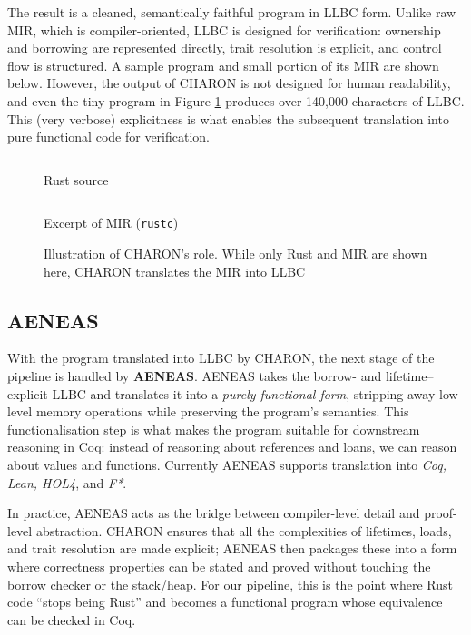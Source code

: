 The result is a cleaned, semantically faithful program in LLBC form. Unlike raw
MIR, which is compiler-oriented, LLBC is designed for verification: ownership
and borrowing are represented directly, trait resolution is explicit, and
control flow is structured. A sample program and small portion of its MIR are
shown below. However, the output of CHARON is not designed for human
readability, and even the tiny program in Figure \ref{fig:charon_translation}
produces over 140,000 characters of LLBC. This (very verbose) explicitness is
what enables the subsequent translation into pure functional code for
verification.

\begin{figure}[ht]
  \centering
  \begin{minipage}[t]{0.45\linewidth}
    \inputminted[linenos, breaklines, frame=none, fontsize=\footnotesize]{rust}{3_Chapter3/CHARON_example/rust.rs}
    \vfill
    \caption*{Rust source}
  \end{minipage}
  \hfill
  \begin{minipage}[t]{0.45\linewidth}
    \inputminted[linenos, breaklines, frame=none, fontsize=\footnotesize]{text}{3_Chapter3/CHARON_example/mir.txt}
    \vfill
    \caption*{Excerpt of MIR (\texttt{rustc})}
  \end{minipage}
  \caption{Illustration of CHARON's role. While only Rust and MIR are shown here, CHARON translates the MIR into LLBC}
  \label{fig:charon_translation}
\end{figure}

\subsection{AENEAS}

With the program translated into LLBC by CHARON, the next stage of the pipeline
is handled by \textbf{AENEAS}. AENEAS takes the borrow- and lifetime–explicit
LLBC and translates it into a \emph{purely functional form}, stripping away
low-level memory operations while preserving the program's semantics. This
functionalisation step is what makes the program suitable for downstream
reasoning in Coq: instead of reasoning about references and loans, we can reason
about values and functions. Currently AENEAS supports translation into
\emph{Coq, Lean, HOL4}, and \emph{F*}.

In practice, AENEAS acts as the bridge between compiler-level detail and
proof-level abstraction. CHARON ensures that all the complexities of lifetimes,
loads, and trait resolution are made explicit; AENEAS then packages these into a
form where correctness properties can be stated and proved without touching the
borrow checker or the stack/heap. For our pipeline, this is the point where Rust
code ``stops being Rust'' and becomes a functional program whose equivalence can
be checked in Coq.


